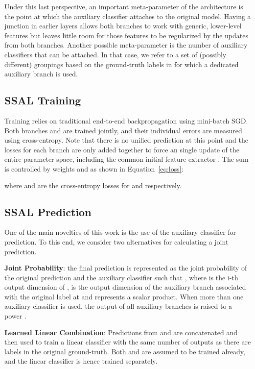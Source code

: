\documentclass[10pt,twocolumn,letterpaper]{article}
\begin{document}
Under this last perspective, an important meta-parameter of the architecture is the point at which the auxiliary classifier attaches to the original model.
Having a junction in earlier layers allows both branches to work with generic, lower-level features but leaves little room for those features to be regularized by the updates from both branches.
Another possible meta-parameter is the number of auxiliary classifiers that can be attached.
In that case, we refer to a set of (possibly different) groupings  based on the ground-truth labels in  for which a dedicated auxiliary branch  is used.

\subsection{SSAL Training}
Training relies on traditional end-to-end backpropagation using mini-batch SGD.
Both branches  and  are trained jointly, and their individual errors are measured using cross-entropy.
Note that there is no unified prediction at this point and the losses for each branch are only added together to force an single update of the entire parameter space, including the common initial feature extractor .
The sum is controlled by weights  and  as shown in Equation~\ref{eq:loss}:



where  and  are the cross-entropy losses for  and  respectively.

\subsection{SSAL Prediction}
\label{subsec:prediction}
One of the main novelties of this work is the use of the auxiliary classifier for prediction.
To this end, we consider two alternatives for calculating a joint prediction.

\textbf{Joint Probability}: the final prediction is represented as the joint probability of the original prediction and the auxiliary classifier such that , where  is the i-th output dimension of ,  is the output dimension of the auxiliary branch associated with the original label at  and  represents a scalar product.
When more than one auxiliary classifier is used, the output of all auxiliary branches  is raised to a power .

\textbf{Learned Linear Combination}: Predictions from  and  are concatenated and then used to train a linear classifier with the same number of outputs as there are labels in the original ground-truth.
Both  and  are assumed to be trained already, and the linear classifier is hence trained separately.
\end{document}
